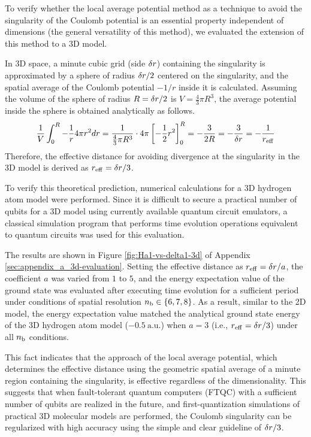 \documentclass[jctc-draft.tex]{subfiles}
\begin{document}
To verify whether the local average potential method as a technique to avoid the
singularity of the Coulomb potential is an essential property independent of
dimensions (the general versatility of this method), we evaluated the extension
of this method to a 3D model.

In 3D space, a minute cubic grid (side $\delta r$) containing the singularity is
approximated by a sphere of radius $\delta r/2$ centered on the singularity, and
the spatial average of the Coulomb potential $-1/r$ inside it is calculated.
Assuming the volume of the sphere of radius $R = \delta r/2$ is $V =
\frac{4}{3}\pi R^3$, the average potential inside the sphere is obtained
analytically as follows.
\begin{equation}
    \frac{1}{V} \int_{0}^{R} -\frac{1}{r} 4\pi r^2 dr 
    = \frac{1}{\frac{4}{3}\pi R^3} \cdot 4\pi
      \left[ -\frac{1}{2}r^2 \right]_{0}^{R} 
    = -\frac{3}{2R} = -\frac{3}{\delta r}=-\frac{1}{r_{\mathrm{eff}}}
\end{equation}
Therefore, the effective distance for avoiding divergence at the singularity in
the 3D model is derived as $r_{\mathrm{eff}} = \delta r/3$.

To verify this theoretical prediction, numerical calculations for a 3D hydrogen
atom model were performed. Since it is difficult to secure a practical number of
qubits for a 3D model using currently available quantum circuit emulators, a
classical simulation program that performs time evolution operations equivalent
to quantum circuits was used for this evaluation.

The results are shown in Figure \ref{fig:Ha1-vs-delta1-3d} of Appendix
\ref{sec:appendix_a_3d-evaluation}. Setting the effective distance as
$r_{\mathrm{eff}} = \delta r/a$, the coefficient $a$ was varied from $1$ to $5$,
and the energy expectation value of the ground state was evaluated after
executing time evolution for a sufficient period under conditions of spatial
resolution $n_{\mathrm{b}} \in \{6, 7, 8\}$. As a result, similar to the 2D model, the
energy expectation value matched the analytical ground state energy of the 3D
hydrogen atom model ($-0.5\ \mathrm{a.u.}$) when $a=3$ (i.e., $r_{\mathrm{eff}}
= \delta r/3$) under all $n_{\mathrm{b}}$ conditions.

This fact indicates that the approach of the local average potential, which
determines the effective distance using the geometric spatial average of a minute
region containing the singularity, is effective regardless of the
dimensionality. This suggests that when fault-tolerant quantum computers (FTQC)
with a sufficient number of qubits are realized in the future, and
first-quantization simulations of practical 3D molecular models are performed,
the Coulomb singularity can be regularized with high accuracy using the simple
and clear guideline of $\delta r/3$.
\end{document}
